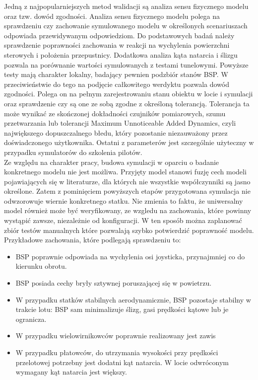 \documentclass[15pt]{sprawozdanie}
\begin{document}
Jedną z najpopularniejszych metod walidacji są analiza sensu fizycznego modelu oraz tzw. dowód zgodności. Analiza sensu fizycznego modelu polega na sprawdzeniu czy zachowanie symulowanego modelu w określonych scenariuszach odpowiada przewidywanym odpowiedziom. Do podstawowych badań należy sprawdzenie poprawności zachowania w reakcji na wychylenia powierzchni sterowych i położenia przepustnicy. Dodatkowa analiza kąta natarcia i ślizgu pozwala na porównanie wartości symulowanych z testami tunelowymi. Powyższe testy mają charakter lokalny, badający pewnien podzbiór stanów BSP. W przeciwieństwie do tego na podjęcie całkowitego werdyktu pozwala dowód zgodności. Polega on na pełnym zarejestrowaniu stanu obiektu w locie i symulacji oraz sprawdzenie czy są one ze sobą zgodne z określoną tolerancją. Tolerancja ta może wynikać ze skończonej dokładności czujników pomiarowych, szumu przetwarzania lub tolerancji Maximum Unnoticeable Added Dynamics, czyli największego dopuszczalnego błedu, który pozostanie niezauważony przez doświadczonego użytkownika. Ostatni z parameterów jest szczególnie użyteczny w przypadku symulatorów do szkolenia pilotów.\\

Ze względu na charakter pracy, budowa symulacji w oparciu o badanie konkretnego modelu nie jest możliwa. Przyjęty model stanowi fuzję cech modeli pojawiających się w literaturze, dla których nie wszystkie współczynniki są jasno określone. Zatem z pominięciem powyższych etapów przygotowana symulacja nie odwzorowuje wiernie konkretnego statku. Nie zmienia to faktu, że uniwersalny model również może być weryfikowany, ze wzgledu na zachowania, które powinny wystąpić zawsze, niezależnie od konfiguracji. W ten sposób można zaplanować zbiór testów manualnych które pozwalają szybko potwierdzić poprawność modelu. Przykładowe zachowania, które podlegają sprawdzeniu to:
\begin{itemize}[noitemsep]
\item BSP poprawnie odpowiada na wychylenia osi joysticka, przynajmniej co do kierunku obrotu.
\item BSP posiada cechy bryły sztywnej poruszającej się w powietrzu.
\item W przypadku statków stabilnych aerodynamicznie, BSP pozostaje stabilny w trakcie lotu: BSP sam minimalizuje ślizg, gasi prędkości kątowe lub je ogranicza.
\item W przypadku wielowirnikowców poprawnie realizowany jest zawis
\item W przypadku płatowców, do utrzymania wysokości przy prędkości przelotowej potrzebny jest dodatni kąt natarcia. W locie odwróconym wymagany kąt natarcia jest większy.
\end{itemize}
\end{document}
